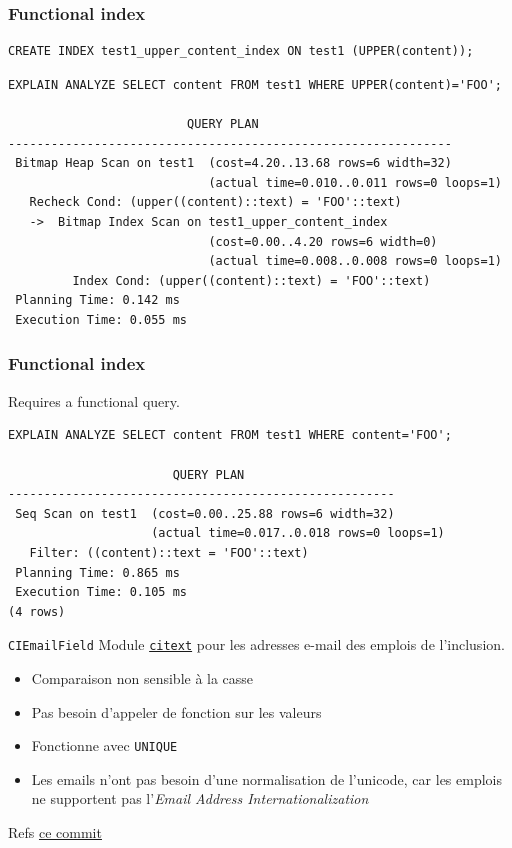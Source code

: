 \documentclass{beamer}
\begin{document}
\begin{frame}[fragile]
    \frametitle{Functional index}
    \begin{verbatim}
CREATE INDEX test1_upper_content_index ON test1 (UPPER(content));
    \end{verbatim}
    \vspace{-25pt}
    \begin{verbatim}
EXPLAIN ANALYZE SELECT content FROM test1 WHERE UPPER(content)='FOO';

                         QUERY PLAN
--------------------------------------------------------------
 Bitmap Heap Scan on test1  (cost=4.20..13.68 rows=6 width=32)
                            (actual time=0.010..0.011 rows=0 loops=1)
   Recheck Cond: (upper((content)::text) = 'FOO'::text)
   ->  Bitmap Index Scan on test1_upper_content_index
                            (cost=0.00..4.20 rows=6 width=0)
                            (actual time=0.008..0.008 rows=0 loops=1)
         Index Cond: (upper((content)::text) = 'FOO'::text)
 Planning Time: 0.142 ms
 Execution Time: 0.055 ms
    \end{verbatim}
\end{frame}

\begin{frame}[fragile]
    \frametitle{Functional index}

     Requires a functional query.
    \begin{verbatim}
EXPLAIN ANALYZE SELECT content FROM test1 WHERE content='FOO';

                       QUERY PLAN
------------------------------------------------------
 Seq Scan on test1  (cost=0.00..25.88 rows=6 width=32)
                    (actual time=0.017..0.018 rows=0 loops=1)
   Filter: ((content)::text = 'FOO'::text)
 Planning Time: 0.865 ms
 Execution Time: 0.105 ms
(4 rows)
    \end{verbatim}
\end{frame}

\begin{frame}{\texttt{CIEmailField}}
    Module \href{https://devdocs.io/postgresql~15/citext}{\texttt{citext}} pour les adresses e-mail des emplois de l’inclusion.

    \begin{itemize}
        \item Comparaison non sensible à la casse
        \item Pas besoin d’appeler de fonction sur les valeurs
        \item Fonctionne avec \texttt{UNIQUE}
        \item Les emails n’ont pas besoin d’une normalisation de l'unicode, car les emplois ne supportent pas l'\textit{Email Address Internationalization}
    \end{itemize}

    Refs \href{https://github.com/gip-inclusion/les-emplois/commit/c2a250388277f429fdc22b89205ef959681471ad}{ce commit}
\end{frame}
\end{document}
